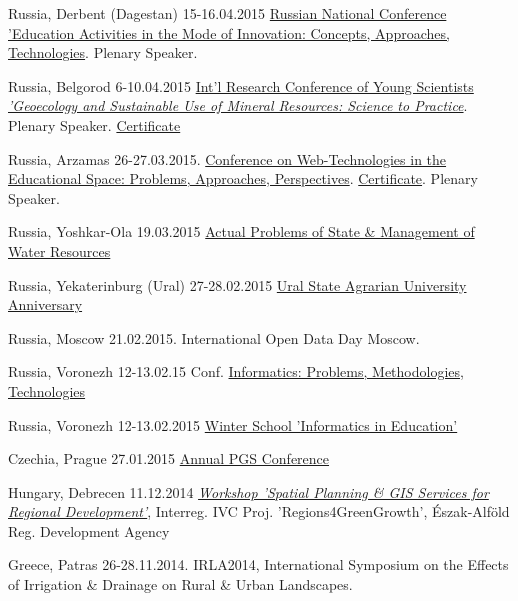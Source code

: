 \documentclass[10pt]{article}
\begin{document}
\begin{etaremune}
	\item	Russia, Derbent (Dagestan) 15-16.04.2015  \href{http://konferencii.ru/info/111030}{Russian National Conference 'Education Activities in the Mode of Innovation: Concepts, Approaches, Technologies}. Plenary Speaker. 					
	\item	Russia, Belgorod 6-10.04.2015 \href{http://ggf.bsu.edu.ru/Conferences/Conf_04_2015/conf_04_2015.htm}{ Int'l Research Conference of Young Scientists \emph{'Geoecology and Sustainable Use of Mineral Resources: Science to Practice}}. Plenary Speaker. \href{https://drive.google.com/open?id=1LQ-unvt7Tb3JGqkEUTGxdzNCumt4Zte_}{Certificate} 				
	\item	Russia, Arzamas 26-27.03.2015. \href{http://matematikum.ucoz.ru/}{Conference on Web-Technologies in the Educational Space: Problems, Approaches, Perspectives}. \href{https://drive.google.com/open?id=1Gmj1xyHSv8_Q2Ej6QTSKjPqhn9nFiIUf}{Certificate}. Plenary Speaker.				
	\item	Russia, Yoshkar-Ola 19.03.2015 \href{http://www.volgatech.net/announcements/konferentsii/79482/}{Actual Problems of State \& Management of Water Resources}				
	\item	Russia, Yekaterinburg (Ural) 27-28.02.2015  \href{http://urgau.ru/index.php/75let-urgau/programma}{Ural State Agrarian University Anniversary}		
	\item Russia, Moscow 21.02.2015. International Open Data Day Moscow.	
	\item	Russia, Voronezh 12-13.02.15  Conf. \href{http://www.cs.vsu.ru/conf/}{Informatics: Problems, Methodologies, Technologies} 
	\item	Russia, Voronezh 12-13.02.2015 \href{http://www.cs.vsu.ru/conf/}{ Winter School 'Informatics in Education'} 		
	\item	Czechia, Prague 27.01.2015  \href{https://www.natur.cuni.cz/fakulta/zivotni-prostredi/aktuality/prilohy-a-obrazky/konference/pgs-koference-2015-program}{Annual PGS Conference}		
	\item Hungary, Debrecen 11.12.2014 \emph{\href{http://www.eurisy.org/event-spatial-planning-and-geospatial-services-for-regional-development_26/about}{Workshop 'Spatial Planning \& GIS Services for Regional Development'}}, Interreg. IVC Proj. 'Regions4GreenGrowth', \'{E}szak-Alf\"{o}ld Reg. Development Agency
	\item Greece, Patras 26-28.11.2014. IRLA2014,  International Symposium on the Effects of Irrigation \& Drainage on Rural \& Urban Landscapes.			

\end{etaremune}
\end{document}
